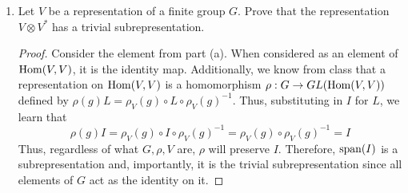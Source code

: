\documentclass[../psets.tex]{subfiles}
\begin{document}
\begin{enumerate}
\begin{enumerate}
        \begin{proof}
            Let $v\in\im(P)$ be arbitrary. Since $v\in\im(P)$, we have that $v=Pw$ for some $w\in V$. But since $P=P^2$, it follows that
            \begin{equation*}
                Pv = P^2w = Pw = v
            \end{equation*}
            Thus, the restriction $P_1$ of $P$ to $\im(P)$ is equal to the identity on $\im(P)$.\par
            Let $v\in V\setminus\im(P)$ be arbitrary. Since $v\notin\im(P)$, $v\in\ker(P)$ so
            \begin{equation*}
                Pv = 0
            \end{equation*}
            Thus, the restriction $P_2$ of $P$ to $\ker(P)$ is equal to the zero map on $\ker(P)$.\par
            Since $V=\im(P)\oplus\ker(P)$, $P=P_1\oplus P_2$. In particular, there will exist an orthonormal basis in which the first $k$ vectors form a basis of $\im(P)$ and the next $n-k$ vectors form a basis of $\ker(P)$. Thus, $\dim(\im(P))=k$. Moreover, with respect to this basis, the $n\times n$ matrix of $P$ will have a $k\times k$ block in the upper left-hand corner in which $I_k$ resides, and it will be zeroes everywhere else. Since the trace is invariant under similarity transformations, it can be read off from this matrix as $k$ as well.
        \end{proof}
        \item Let $V$ be a representation of a finite group $G$. Prove that the representation $V\otimes V^*$ has a trivial subrepresentation.
        \begin{proof}
            Consider the element from part (a). When considered as an element of $\operatorname{Hom}(V,V)$, it is the identity map. Additionally, we know from class that a representation on $\operatorname{Hom}(V,V)$ is a homomorphism $\rho:G\to GL(\operatorname{Hom}(V,V))$ defined by $\rho(g)L=\rho_V(g)\circ L\circ\rho_V(g)^{-1}$. Thus, substituting in $I$ for $L$, we learn that
            \begin{equation*}
                \rho(g)I = \rho_V(g)\circ I\circ\rho_V(g)^{-1}
                = \rho_V(g)\circ\rho_V(g)^{-1}
                = I
            \end{equation*}
            Thus, regardless of what $G,\rho,V$ are, $\rho$ will preserve $I$. Therefore, $\operatorname{span}(I)$ is a subrepresentation and, importantly, it is the trivial subrepresentation since all elements of $G$ act as the identity on it.
        \end{proof}
    \end{enumerate}
\end{enumerate}
\end{document}
